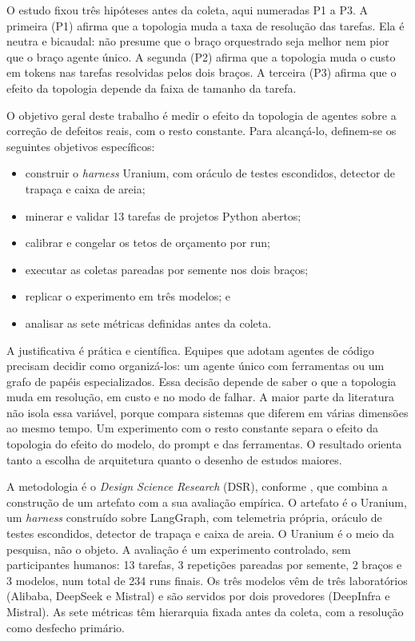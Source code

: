 O estudo fixou três hipóteses antes da coleta, aqui numeradas P1 a P3. A primeira (P1) afirma que a topologia muda a taxa de resolução das tarefas. Ela é neutra e bicaudal: não presume que o braço orquestrado seja melhor nem pior que o braço agente único. A segunda (P2) afirma que a topologia muda o custo em tokens nas tarefas resolvidas pelos dois braços. A terceira (P3) afirma que o efeito da topologia depende da faixa de tamanho da tarefa.

O objetivo geral deste trabalho é medir o efeito da topologia de agentes sobre a correção de defeitos reais, com o resto constante. Para alcançá-lo, definem-se os seguintes objetivos específicos:
\begin{itemize}
    \item construir o \textit{harness} Uranium, com oráculo de testes escondidos, detector de trapaça e caixa de areia;
    \item minerar e validar 13 tarefas de projetos Python abertos;
    \item calibrar e congelar os tetos de orçamento por run;
    \item executar as coletas pareadas por semente nos dois braços;
    \item replicar o experimento em três modelos; e
    \item analisar as sete métricas definidas antes da coleta.
\end{itemize}

A justificativa é prática e científica. Equipes que adotam agentes de código precisam decidir como organizá-los: um agente único com ferramentas ou um grafo de papéis especializados. Essa decisão depende de saber o que a topologia muda em resolução, em custo e no modo de falhar. A maior parte da literatura não isola essa variável, porque compara sistemas que diferem em várias dimensões ao mesmo tempo. Um experimento com o resto constante separa o efeito da topologia do efeito do modelo, do prompt e das ferramentas. O resultado orienta tanto a escolha de arquitetura quanto o desenho de estudos maiores.

A metodologia é o \textit{Design Science Research} (DSR), conforme \cite{Wieringa2009, Wieringa2014}, que combina a construção de um artefato com a sua avaliação empírica. O artefato é o Uranium, um \textit{harness} construído sobre LangGraph, com telemetria própria, oráculo de testes escondidos, detector de trapaça e caixa de areia. O Uranium é o meio da pesquisa, não o objeto. A avaliação é um experimento controlado, sem participantes humanos: 13 tarefas, 3 repetições pareadas por semente, 2 braços e 3 modelos, num total de 234 runs finais. Os três modelos vêm de três laboratórios (Alibaba, DeepSeek e Mistral) e são servidos por dois provedores (DeepInfra e Mistral). As sete métricas têm hierarquia fixada antes da coleta, com a resolução como desfecho primário.

